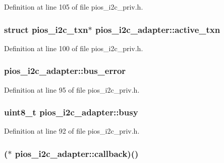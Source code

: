 Definition at line 105 of file pios\-\_\-i2c\-\_\-priv.\-h.

\hypertarget{structpios__i2c__adapter_a9f7ec0aa23437d00ceade3b67625eec6}{
\subsubsection[{active\-\_\-txn}]{\setlength{\rightskip}{0pt plus 5cm}struct {\bf pios\-\_\-i2c\-\_\-txn}$\ast$ pios\-\_\-i2c\-\_\-adapter\-::active\-\_\-txn}}\label{structpios__i2c__adapter_a9f7ec0aa23437d00ceade3b67625eec6}


Definition at line 100 of file pios\-\_\-i2c\-\_\-priv.\-h.

\hypertarget{structpios__i2c__adapter_a98b74dc40da65289c18494530b759724}{
\subsubsection[{bus\-\_\-error}]{ pios\-\_\-i2c\-\_\-adapter\-::bus\-\_\-error}}\label{structpios__i2c__adapter_a98b74dc40da65289c18494530b759724}


Definition at line 95 of file pios\-\_\-i2c\-\_\-priv.\-h.

\hypertarget{structpios__i2c__adapter_a25823130023ae773a53a858647b65fbb}{
\subsubsection[{busy}]{ {\bf uint8\-\_\-t} pios\-\_\-i2c\-\_\-adapter\-::busy}}\label{structpios__i2c__adapter_a25823130023ae773a53a858647b65fbb}


Definition at line 92 of file pios\-\_\-i2c\-\_\-priv.\-h.

\hypertarget{structpios__i2c__adapter_abe4e844b2ffcd0984dc55c8985bd0401}{
\subsubsection[{callback}]{($\ast$ pios\-\_\-i2c\-\_\-adapter\-::callback)()}}\label{structpios__i2c__adapter_abe4e844b2ffcd0984dc55c8985bd0401}


